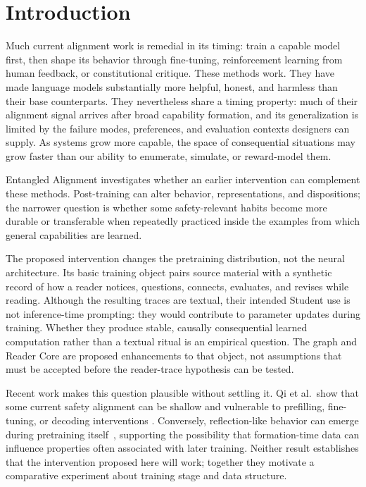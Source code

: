 \documentclass[11pt]{article}
\begin{document}
	\ewfrontmatterend
	\section{Introduction}

Much current alignment work is remedial in its timing: train a capable model first, then shape its behavior through fine-tuning, reinforcement learning from human feedback, or constitutional critique. These methods work. They have made language models substantially more helpful, honest, and harmless than their base counterparts. They nevertheless share a timing property: much of their alignment signal arrives after broad capability formation, and its generalization is limited by the failure modes, preferences, and evaluation contexts designers can supply. As systems grow more capable, the space of consequential situations may grow faster than our ability to enumerate, simulate, or reward-model them.

Entangled Alignment investigates whether an earlier intervention can complement these methods. Post-training can alter behavior, representations, and dispositions; the narrower question is whether some safety-relevant habits become more durable or transferable when repeatedly practiced inside the examples from which general capabilities are learned.

The proposed intervention changes the pretraining distribution, not the neural
architecture. Its basic training object pairs source material with a synthetic
record of how a reader notices, questions, connects, evaluates, and revises
while reading. Although the resulting traces are textual, their intended
Student use is not inference-time prompting: they would contribute to parameter
updates during training. Whether they produce stable, causally consequential
learned computation rather than a textual ritual is an empirical question. The
graph and Reader Core are proposed enhancements to that object, not assumptions
that must be accepted before the reader-trace hypothesis can be tested.

Recent work makes this question plausible without settling it. Qi et al.\ show that some current safety alignment can be shallow and vulnerable to prefilling, fine-tuning, or decoding interventions \cite{qi2024safety}. Conversely, reflection-like behavior can emerge during pretraining itself~\cite{rethinkingreflection2025}, supporting the possibility that formation-time data can influence properties often associated with later training. Neither result establishes that the intervention proposed here will work; together they motivate a comparative experiment about training stage and data structure.
\end{document}
